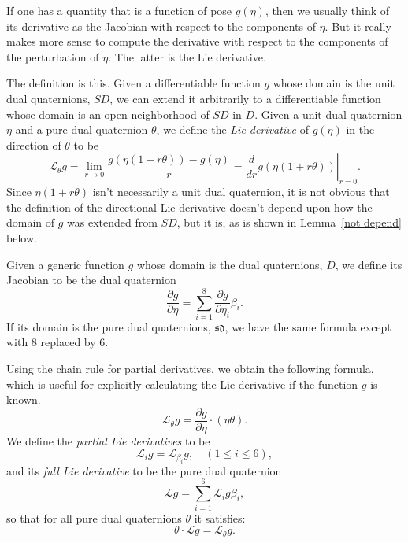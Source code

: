 \documentclass[reqno,12pt]{amsart}
\newcommand\setdualquat{D}
\newcommand\setunitdualquat{SD}
\newcommand\setpuredualquat{\mathfrak{sd}}
\newcommand{\liederiv}{\mathcal L}
\begin{document}
If one has a quantity that is a function of pose $g(\eta)$, then we usually think of its derivative as the Jacobian with respect to the components of $\eta$.  But it really makes more sense to compute the derivative with respect to the components of the perturbation of $\eta$.  The latter is the Lie derivative.

The definition is this.  Given a differentiable function $g$ whose domain is the unit dual quaternions, $\setunitdualquat$, we can extend it arbitrarily to a differentiable function whose domain is an open neighborhood of $\setunitdualquat$ in $\setdualquat$.  Given a unit dual quaternion $\eta$ and a pure dual quaternion $\theta$, we define the \emph{Lie derivative} of $g(\eta)$ in the direction of $\theta$ to be
\begin{equation}
\label{lie diff defn}
\liederiv_\theta g = 
\lim_{r\to 0} \frac{g(\eta(1+r \theta)) - g(\eta)} r = 
\left. \frac{d}{d r} g(\eta(1+r\theta)) \right |_{r = 0}.
\end{equation}
Since $\eta(1+r\theta)$ isn't necessarily a unit dual quaternion, it is not obvious that the definition of the directional Lie derivative doesn't depend upon how the domain of $g$ was extended from $\setunitdualquat$, but it is, as is shown in Lemma~\ref{not depend} below.

Given a generic function $g$ whose domain is the dual quaternions, $\setdualquat$, we define its Jacobian to be the dual quaternion
\begin{equation}
\frac{\partial g}{\partial \eta} = \sum_{i=1}^8 \frac{\partial g}{\partial \eta_i} \beta_i.
\end{equation}
If its domain is the pure dual quaternions, $\setpuredualquat$, we have the same formula except with $8$ replaced by $6$.

Using the chain rule for partial derivatives, we obtain the following formula, which is useful for explicitly calculating the Lie derivative if the function $g$ is known.
\begin{equation}
\label{lie diff defn 2}
\liederiv_\theta g = \frac{\partial g}{\partial \eta} \cdot (\eta \theta).
\end{equation}
We define the \emph{partial Lie derivatives} to be
\begin{equation}
\liederiv_i g = \liederiv_{\beta_i} g , \quad (1 \le i \le 6),
\end{equation}
and its \emph{full Lie derivative} to be the pure dual quaternion
\begin{equation}
\liederiv g = \sum_{i=1}^6 \liederiv_i g \beta_i,
\end{equation}
so that for all pure dual quaternions $\theta$ it satisfies:
\begin{equation}
\theta \cdot \liederiv g = \liederiv_\theta g.
\end{equation}
\end{document}
